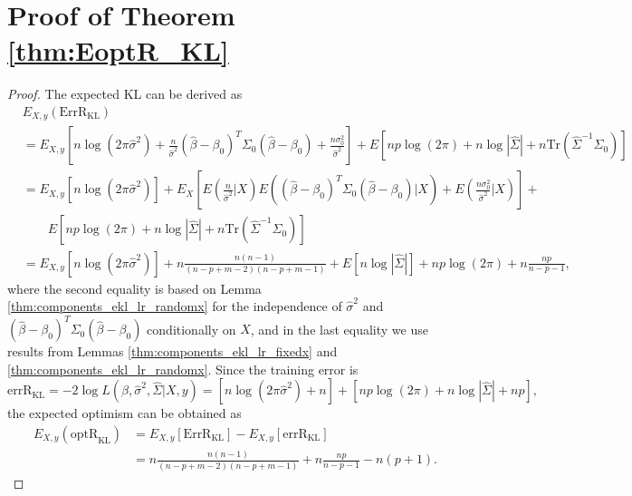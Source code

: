 \section{Proof of Theorem \ref{thm:EoptR_KL}}
\begin{proof}
The expected KL can be derived as
\begin{equation*}
\begin{aligned}
&E_{X,y} (\text{ErrR}_\text{KL}) \\
&= E_{X,y} \left [ n \log (2\pi \hat\sigma^2) + \frac{n}{\hat\sigma^2}  (\hat\beta-\beta_0)^T \Sigma_0 (\hat\beta-\beta_0) + \frac{n\sigma_0^2}{\hat\sigma^2} \right ] + E \left [np \log(2\pi) + n \log |\hat\Sigma| + n \text{Tr}(\hat\Sigma^{-1}\Sigma_{0}) \right] \\
&= E_{X,y} \left [ n \log (2\pi \hat\sigma^2) \right ] + E_X \left[E\left(\frac{n}{\hat\sigma^2} \big | X \right)  E\left((\hat\beta-\beta_0)^T \Sigma_0 (\hat\beta-\beta_0) \big| X \right) + E\left(\frac{n\sigma_0^2}{\hat\sigma^2} \big| X \right) \right] + \\
 & \qquad E \left [np \log(2\pi) + n \log |\hat\Sigma| + n \text{Tr}(\hat\Sigma^{-1}\Sigma_{0}) \right] \\
&= E_{X,y} \left [ n\log (2\pi \hat \sigma^2) \right ] +  n \frac{n(n-1)}{(n-p+m-2)(n-p+m-1)} + E \left [ n\log |\hat \Sigma| \right ] + np\log(2\pi) + n \frac{np}{n-p-1},
\end{aligned}
\end{equation*}
where the second equality is based on Lemma \ref{thm:components_ekl_lr_randomx} for the independence of $\hat\sigma^2$ and $(\hat\beta-\beta_0)^T \Sigma_0 (\hat\beta-\beta_0)$ conditionally on $X$, and in the last equality we use results from Lemmas \ref{thm:components_ekl_lr_fixedx} and \ref{thm:components_ekl_lr_randomx}. Since the training error is
\begin{equation*}
\text{errR}_\text{KL} = -2\log L(\hat\beta,\hat\sigma^2,\hat\Sigma|X,y) = \left [ n \log (2\pi \hat\sigma^2) + n \right ] + \left [np \log(2\pi) + n \log |\hat\Sigma| + np \right ],
\end{equation*}
the expected optimism can be obtained as
\begin{equation*}
\begin{aligned}
E_{X,y}(\text{optR}_\text{KL}) 
&= E_{X,y}[\text{ErrR}_\text{KL} ]  -  E_{X,y}[\text{errR}_\text{KL} ] \\
&= n \frac{n(n-1)}{(n-p+m-2)(n-p+m-1)} + n \frac{np}{n-p-1} - n(p+1).
\end{aligned}
\end{equation*}
\end{proof}


